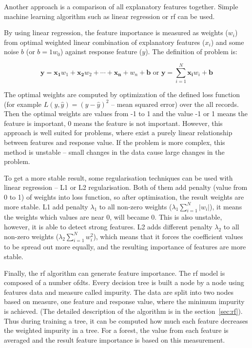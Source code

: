 \documentclass[thesis=M,english]{FITthesis}[2012/10/20]
\begin{document}
Another approach is a comparison of all explanatory features together. Simple machine learning algorithm such as linear regression or \gls{rf} can be used.\cite{Saabas2014regularization} 

By using linear regression, the feature importance is measured as weights ($w_i$) from optimal weighted linear combination of explanatory features ($x_i$) and some noise $b$ (or $b = 1 w_0$) against response feature ($y$). The definition of problem is:

\begin{equation}
\mathbf{y} = \mathbf{x_1} w_1 + \mathbf{x_2} w_2 + \cdots + \mathbf{x_n} + w_n + \mathbf{b} \text{ or } \mathbf{y} = \sum_{i = 1}^{N}{\mathbf{x_i} w_i} + \mathbf{b} 
\end{equation}

\noindent The optimal weights are computed by optimization of the defined loss function (for example $L(y, \hat{y}) = (y-\hat{y})^2$ -- mean squared error) over the all records. Then the optimal weights are values from -1 to 1 and the value -1 or 1 means the feature is important, 0 means the feature is not important. However, this approach is well suited for problems, where exist a purely linear relationship between features and response value. If the problem is more complex, this method is unstable -- small changes in the data cause large changes in the problem.\cite{Saabas2014regularization}

To get a more stable result, some regularisation techniques can be used with linear regression -- L1 or L2 regularisation. Both of them add penalty (value from 0 to 1) of weights into loss function, so after optimisation, the result weights are more stable. L1 add penalty $\lambda_1$ to all non-zero weights ($\lambda_1 \sum_{i = 1}^{N}{|w_i|}$), it means the weights which values are near 0, will became 0. This is also unstable, however, it is able to detect strong features. L2 adds different penalty $\lambda_2$ to all non-zero weights ($\lambda_2 \sum_{i = 1}^{N}{w_i^2}$), which means that it forces the coefficient values to be spread out more equally, and the resulting importance of features are more stable. \cite{Saabas2014regularization}

Finally, the \gls{rf} algorithm can generate feature importance. The \gls{rf} model is composed of a number of\gls{dt}s. Every decision tree is built a node by a node using features data and measure called impurity. The data are split into two nodes based on measure, one feature and response value, where the minimum impurity is achieved. (The detailed description of the algorithm is in the section~\ref{sec:rf}). Thus during training a tree, it can be computed how much each feature decreases the weighted impurity in a tree.\cite{Saabas2014rf} For a forest, the value from each feature is averaged and the result feature importance is based on this measurement. 
\end{document}
